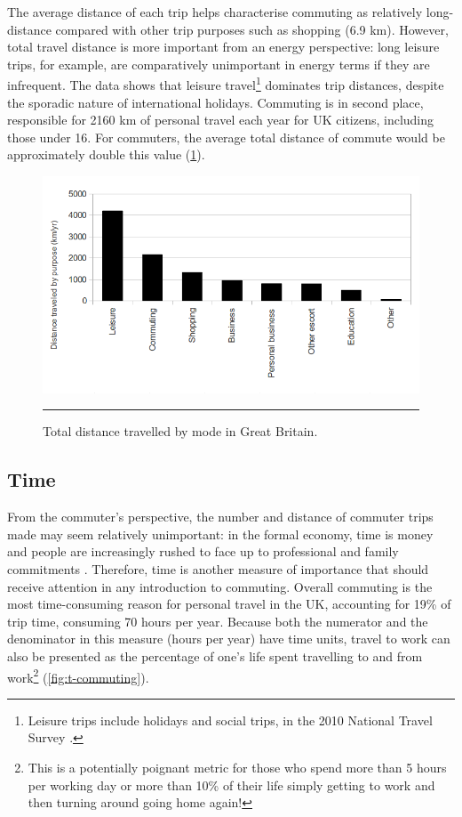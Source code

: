 The average distance of each trip helps characterise commuting as relatively
long-distance compared with other trip purposes such as shopping (6.9 km).
However, total travel distance is more important from an energy perspective:
long leisure trips, for example, are comparatively unimportant in energy terms if
they are infrequent. The data shows that leisure travel\footnote{Leisure
trips include holidays and social trips, in the 2010 National Travel
Survey \citep{Dft2011-notes}.} dominates trip distances, despite the sporadic
nature of international holidays. Commuting is in second place, responsible for
2160 km of personal travel each year for UK citizens, including those under 16.
For commuters, the average total distance of commute would be approximately
double this value (\cref{fig:dist-purp-gb}).

\begin{figure}[htbp]
  \centerline{
    \includegraphics[width = 14 cm]{./Figures/dist-purp-gb}}
    \rule{35em}{0.5pt}
  \caption{Total distance travelled by mode in Great Britain.}
  \label{fig:dist-purp-gb}
\end{figure}

\subsection{Time}
From the commuter's perspective, the number and distance of commuter trips made
may seem relatively unimportant: in the formal economy, time is money and
people are increasingly rushed to face up to professional and family
commitments \citep{Eisenstein2011}. Therefore, time is another measure of importance that
should receive attention in any introduction to commuting. Overall commuting is
the most time-consuming reason for personal travel in the UK, accounting
for 19\% of trip time, consuming 70 hours per year. Because both the numerator
and the denominator in this measure (hours per year) have time units, travel to
work can also be presented as the percentage of one's life spent travelling to
and from work\footnote{This
is a potentially poignant metric for those who
spend more than 5 hours per working day or more than 10\% of their life simply
getting to work and then turning around going home again!}
(\cref{fig:t-commuting}).

